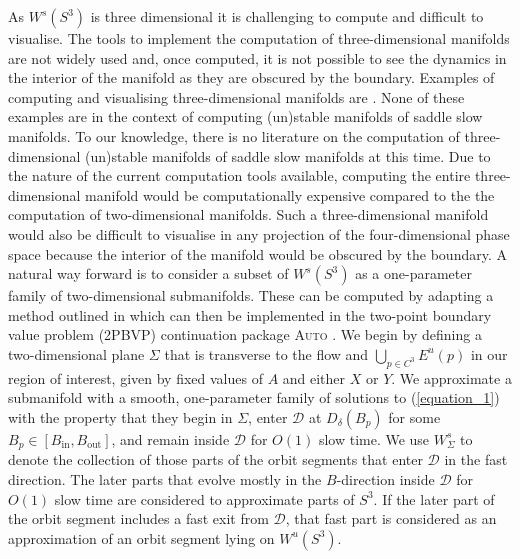\documentclass{ws-ijbc}
\begin{document}
As $W^s(S^3)$ is three dimensional it is challenging to compute and difficult to visualise.  The tools to implement the computation of three-dimensional manifolds are not widely used and, once computed, it is not possible to see the dynamics in the interior of the manifold as they are obscured by the boundary.  Examples of computing and visualising three-dimensional manifolds are \cite{Initial_conditions_volume, Invariant_tori_again, Invariant_tori}.  None of these examples are in the context of computing (un)stable manifolds of saddle slow manifolds.  To our knowledge, there is no literature on the computation of three-dimensional (un)stable manifolds of saddle slow manifolds at this time.  Due to the nature of the current computation tools available, computing the entire three-dimensional manifold would be computationally expensive compared to the the computation of two-dimensional manifolds. Such a three-dimensional manifold would also be difficult to visualise in any projection of the four-dimensional phase space because the interior of the manifold would be obscured by the boundary.  A natural way forward is to consider a subset of $W^s(S^3)$ as a one-parameter family of two-dimensional submanifolds.  These can be computed by adapting a method outlined in \cite{Saeed_Paper} which can then be implemented in the two-point boundary value problem (2PBVP) continuation package \textsc{Auto} \cite{AUTO}.  We begin by defining a two-dimensional plane $\Sigma$  that is transverse to the flow and $\bigcup_{p \in C^3} E^u(p)$ in our region of interest, given by fixed values of $A$ and either $X$ or $Y$.  We approximate a submanifold with a smooth, one-parameter family of solutions to (\ref{equation_1}) with the property that they begin in $\Sigma$, enter $\mathscr{D}$ at $D_{\delta}(B_p)$ for some $B_p \in [B_{\text{in}}, B_{\text{out}}]$, and remain inside $\mathscr{D}$ for $O(1)$ slow time.  We use $W^{s}_{\Sigma}$ to denote the collection of those parts of the orbit segments that enter $\mathscr{D}$ in the fast direction.  The later parts that evolve mostly in the $B$-direction inside $\mathscr{D}$ for $O(1)$ slow time are considered to approximate parts of $S^3$.  If the later part of the orbit segment includes a fast exit from $\mathscr{D}$, that fast part is considered as an approximation of an orbit segment lying on $W^u(S^3)$.
  
\end{document}

